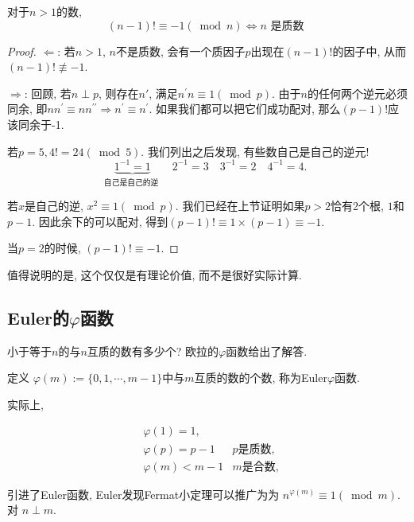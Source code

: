 \documentclass{ctexart}
\begin{document}
\begin{prop}
    对于$n>1$的数, $$
(n-1)!\equiv-1(\bmod n) \Leftrightarrow n \text { 是质数 }
$$
    
\end{prop}

\begin{proof}
    $\Leftarrow$: 若$n>1$, $n$不是质数, 会有一个质因子$p$出现在$(n-1)!$的因子中, 从而$(n-1)!\not\equiv -1$. 

    $\Rightarrow$:  回顾, 若$n \perp p$, 则存在$n'$, 满足$n^{\prime} n \equiv 1(\bmod p)$. 由于$n$的任何两个逆元必须同余, 即$n n^{\prime} \equiv n n^{\prime \prime} \Rightarrow n^{\prime} \equiv n^{\prime}$. 如果我们都可以把它们成功配对, 那么$(p-1)!$应该同余于-1. 

    若$p=5, 4! =24(\bmod 5)$. 我们列出之后发现, 有些数自己是自己的逆元! 
    $$
\underbrace{1^{-1}=1}_{\text {自己是自己的逆 }} \quad 2^{-1}=3 \quad 3^{-1}=2 \quad 4^{-1}=4 \text {. }
$$

  若$x$是自己的逆, $x^2\equiv 1(\bmod p)$. 我们已经在上节证明如果$p>2$恰有2个根, $1$和$p-1$. 因此余下的可以配对, 得到$(p-1)!\equiv 1 \times  (p-1) \equiv -1$. 

当$p=2$的时候, $(p-1)!\equiv -1$. 
\end{proof}

值得说明的是, 这个仅仅是有理论价值, 而不是很好实际计算. 

\subsection{Euler的$\varphi$函数} 小于等于$n$的与$n$互质的数有多少个? 欧拉的$\varphi$函数给出了解答.

\begin{definition}
    定义 $\varphi(m):=\{0,1, \cdots, m-1\}$中与$m$互质的数的个数, 称为Euler$\varphi$函数. 
    
\end{definition}

\begin{example}
实际上, 

\[
    \begin{aligned} & \varphi(1)=1, \\ & \varphi(p)=p-1 & \text{$p$是质数}, \\ & \varphi(m)<m-1&\text{$m$是合数},\end{aligned}
\]
\end{example}

引进了Euler函数, Euler发现Fermat小定理可以推广为为 $n^{\varphi(m)} \equiv 1(\bmod m)$. 对 $n \perp m$.
\end{document}
